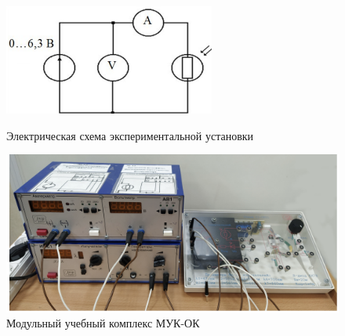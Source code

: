 \newpage
{}

\begin{figure}[H]
    \centering
    \begin{minipage}{0.48\linewidth}
        \centering
        \def\thefigure{7.5}
        \protect{}
        \includegraphics[width=0.9\linewidth]{figs/7-5.png}
        \caption{Электрическая схема экспериментальной установки}
        \label{fig:circuit}
    \end{minipage}\hfill
    \begin{minipage}{0.48\linewidth}
        \centering
        \def\thefigure{7.6}
        \protect{}
        \includegraphics[width=0.9\linewidth]{figs/7-6.png}
        \caption{Модульный учебный комплекс МУК-ОК}
        \label{fig:setup}
    \end{minipage}
\end{figure}

